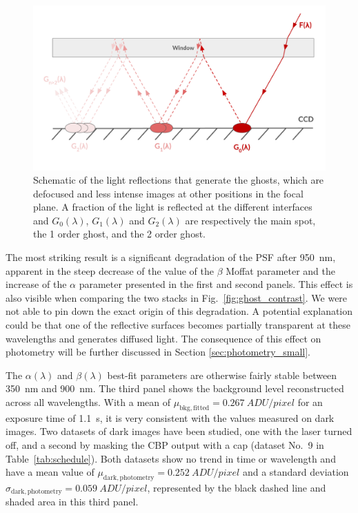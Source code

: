 \begin{figure}[h]
    \centering
    \includegraphics[width=\columnwidth]{fig/schema_ghost.pdf}
    \caption{Schematic of the light reflections that generate the ghosts, which are defocused and less intense images at other positions in the focal plane. A fraction of the light is reflected at the different interfaces and $G_0(\lambda)$, $G_1(\lambda)$ and $G_2(\lambda)$ are respectively the main spot, the 1 order ghost, and the 2 order ghost.}
    \label{fig:schema_ghost}
\end{figure}

The most striking result is a significant degradation of the PSF
after \SI{950}{nm}, apparent in the steep decrease of the value of
the $\beta$ Moffat parameter and the increase of the $\alpha$
parameter presented in the first and second panels. This effect is also
visible when comparing the two stacks in
Fig.~\ref{fig:ghost_contrast}. We were not able to pin down the exact
origin of this degradation. A potential explanation could be that one
of the reflective surfaces becomes partially transparent at these
wavelengths and generates diffused light. The consequence of this
effect on photometry will be further discussed in Section \ref{sec:photometry_small}.

The $\alpha(\lambda)$ and $\beta(\lambda)$ best-fit parameters are
otherwise fairly stable between \SI{350}{\nano\meter} and
\SI{900}{\nano\meter}. The third panel shows the background level
reconstructed across all wavelengths. With a mean of
$\mu_\mathrm{bkg, fitted}=\SI{0.267}{ADU/pixel}$ for an exposure time
of \SI{1.1}{\second}, it is very consistent with the values measured
on dark images. Two datasets of dark images have been studied, one
with the laser turned off, and a second by masking the CBP output with
a cap (dataset No.~9 in Table~\ref{tab:schedule}). Both datasets show
no trend in time or wavelength and have a mean value of
$\mu_\mathrm{dark, photometry}=\SI{0.252}{ADU/pixel}$ and a standard
deviation $\sigma_\mathrm{dark, photometry}=\SI{0.059}{ADU/pixel}$,
represented by the black dashed line and shaded area in this third
panel.

